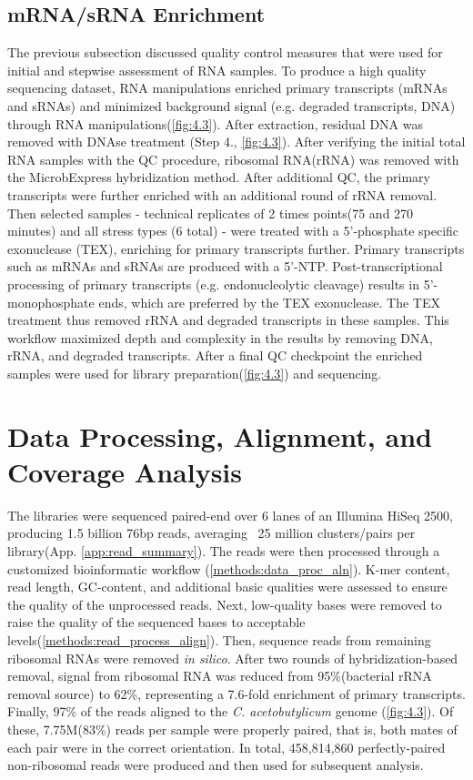 \subsection{mRNA/sRNA Enrichment}
The previous subsection discussed quality control measures that were used for initial and stepwise assessment of RNA samples. To produce a high quality sequencing dataset, RNA manipulations enriched primary transcripts (mRNAs and sRNAs) and minimized background signal (e.g. degraded transcripts, DNA) through RNA manipulations(\ref{fig:4.3}). After extraction, residual DNA was removed with DNAse treatment (Step 4., \ref{fig:4.3}). After verifying the initial total RNA samples with the QC procedure, ribosomal RNA(rRNA) was removed with the MicrobExpress hybridization method. After additional QC, the primary transcripts were further enriched with an additional round of rRNA removal. Then selected samples - technical replicates of 2 times points(75 and 270 minutes) and all stress types (6 total) - were treated with a 5'-phosphate specific exonuclease (TEX), enriching for primary transcripts further. Primary transcripts such as mRNAs and sRNAs are produced with a 5'-NTP. Post-transcriptional processing of primary transcripts (e.g. endonucleolytic cleavage) results in 5'-monophosphate ends, which are preferred by the TEX exonuclease. The TEX treatment thus removed rRNA and degraded transcripts in these samples. This workflow maximized depth and complexity in the results by removing DNA, rRNA, and degraded transcripts. After a final QC checkpoint the enriched samples were used for library preparation(\ref{fig:4.3}) and sequencing.


\section{Data Processing, Alignment, and Coverage Analysis}
The libraries were sequenced paired-end over 6 lanes of an Illumina HiSeq 2500, producing 1.5 billion 76bp reads, averaging ~25 million clusters/pairs per library(App. \ref{app:read_summary}). The reads were then processed through a customized bioinformatic workflow (\ref{methods:data_proc_aln}). K-mer content, read length, GC-content, and additional basic qualities were assessed to ensure the quality of the unprocessed reads. Next, low-quality bases were removed to raise the quality of the sequenced bases to acceptable levels(\ref{methods:read_process_align}). Then, sequence reads from remaining ribosomal RNAs were removed \textit{in silico}. After two rounds of hybridization-based removal, signal from ribosomal RNA was reduced from 95\%(bacterial rRNA removal source) to 62\%, representing a 7.6-fold enrichment of primary transcripts. Finally, 97\% of the reads aligned to the \textit{C. acetobutylicum} genome (\ref{fig:4.3}). Of these, 7.75M(83\%) reads per sample were properly paired, that is, both mates of each pair were in the correct orientation. In total, 458,814,860 perfectly-paired non-ribosomal reads were produced and then used for subsequent analysis.

